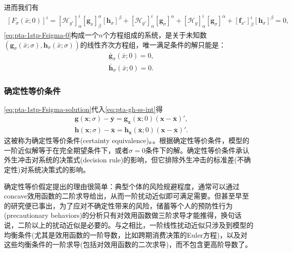 进而我们有
\begin{equation}
  \begin{split}
    \left[F_\sigma(\bar{x};0)\right]^{i} =\left[ \mathcal{H}_{y'} \right]^{i}_{\alpha}
    \left[ \bm{g}_x \right]^{\alpha}_{\beta}
    \left[ \bm{h}_\sigma \right]^{\beta} + \left[ \mathcal{H}_{y'} \right]^{i}_{\alpha}
    \left[ \bm{g}_{\sigma} \right]^{\alpha} +
    \left[ \mathcal{H}_{y} \right]^{i}_{\alpha}
    \left[ \bm{g}_{\sigma} \right]^{\alpha} + \left[\bm{f}_{x'}\right]^{i}_{\beta} \left[ \bm{h}_{\sigma} \right]^{\beta} = 0,
  \end{split}
\end{equation}
\eqref{eq:pta-1stp-Fsigma-0}构成一个$n$个方程组成的系统，是关于未知数$\left( \bm{g}_{\sigma}(\bar{x};\sigma), \bm{h}_{\sigma}(\bar{x};\sigma)\right)$的线性齐次方程组，唯一满足条件的解只能是：
\begin{equation}
  \label{eq:pta-1stp-Fsigma-solution}
  \begin{split}
    &\bar{\bm{g}}_{\sigma}(\bar{x};0)=0, \\
    &\bar{\bm{h}}_{\sigma}(\bar{x};0)=0.
  \end{split}
\end{equation}

\subsubsection{确定性等价条件}
\label{sec:pta-certainty-equivalence-cond}
\eqref{eq:pta-1stp-Fsigma-solution}代入\eqref{eq:pta-gh-ss-int}得
\begin{equation}
  \label{eq:pta-gh-ss-certainty-equiv}
  \begin{split}
    &\bm{g}(\bm{x};\sigma) - \bar{\bm{y}}= \bm{g_x}(\bar{\bm{x}}; 0) (\bm{x} - \bar{\bm{x}})',\\
    &\bm{h}(\bm{x};\sigma) - \bar{\bm{x}}=  \bm{h_x}(\bar{\bm{x}}; 0) (\bm{x} - \bar{\bm{x}})'.
  \end{split}
\end{equation}
这被称为确定性等价条件(certainty equivalence)。\cite{Simon:1956gj, Theil:1957jh}。根据确定性等价条件，模型的一阶近似解等于在完全期望条件下，或者$\sigma =0$条件下的解。确定性等价条件承认外生冲击对系统的决策式(decision rule)的影响，但它排除外生冲击的标准差(不确定性)对系统决策式的影响。

确定性等价假定提出的理由很简单：典型个体的风险规避程度，通常可以通过concave效用函数的二阶求导给出，从而一阶扰动近似即可满足需要。但甚至早至\cite{Leland:1968go,Sandmo:1970by}的研究便已事出，为了应对不确定性带来的风险，储蓄等个人的预防性行为(precautionary behaviors)的分析只有对效用函数做三阶求导才能推得，换句话说，二阶以上的扰动近似是必要的。与之相比，一阶线性扰动近似只涉及到模型的均衡条件(尤其是效用函数的一阶导数，比如跨期消费决策的Euler方程)，以及对这些均衡条件的一阶求导(包括对效用函数的二次求导)，而不包含更高阶导数了。

